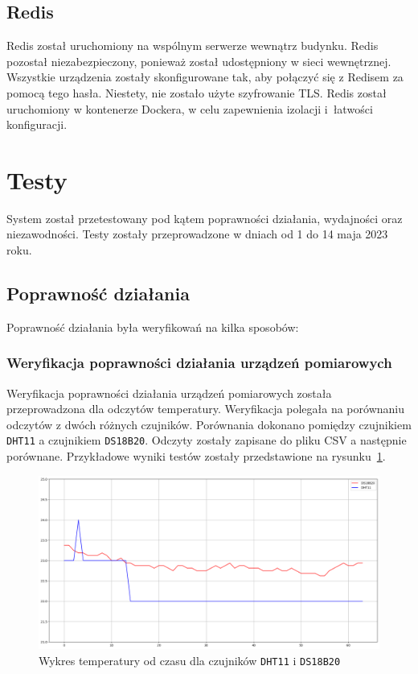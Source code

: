 \subsection{Redis}
Redis został uruchomiony na wspólnym serwerze wewnątrz budynku. Redis pozostał niezabezpieczony, ponieważ został udostępniony w sieci wewnętrznej. Wszystkie urządzenia zostały skonfigurowane tak, aby połączyć się z Redisem za pomocą tego hasła. Niestety, nie zostało użyte szyfrowanie TLS. Redis został uruchomiony w kontenerze Dockera, w celu zapewnienia izolacji i~łatwości konfiguracji.

\section{Testy}
System został przetestowany pod kątem poprawności działania, wydajności oraz niezawodności. Testy zostały przeprowadzone w dniach od 1 do 14 maja 2023 roku.

\subsection{Poprawność działania}
Poprawność działania była weryfikowań na kilka sposobów:

\subsubsection{Weryfikacja poprawności działania urządzeń pomiarowych}

Weryfikacja poprawności działania urządzeń pomiarowych została przeprowadzona dla
odczytów temperatury. Weryfikacja polegała na porównaniu odczytów z dwóch różnych czujników. Porównania dokonano pomiędzy czujnikiem \texttt{DHT11} a czujnikiem \texttt{DS18B20}. Odczyty zostały zapisane do pliku CSV a następnie porównane. Przykładowe wyniki testów zostały przedstawione na rysunku~\ref{rys:dht-vs-ds}.

\begin{figure}[b!]
    \begin{center}
        \includegraphics[width=15cm]{pic/dht-vs-ds.png}
    \end{center}
    \caption{Wykres temperatury od czasu dla czujników \texttt{DHT11} i \texttt{DS18B20}}\label{rys:dht-vs-ds}
\end{figure}

